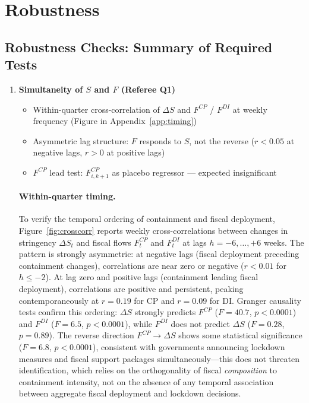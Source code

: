 \documentclass[12pt, a4paper]{article}
\begin{document}
\section{Robustness}
\label{subsec:robustness}


\subsection*{Robustness Checks: Summary of Required Tests}

\begin{enumerate}

\item \textbf{Simultaneity of $S$ and $F$ (Referee Q1)}
\begin{itemize}
    \item Within-quarter cross-correlation of $\Delta S$ and $F^{CP}$ /
        $F^{DI}$ at weekly frequency (Figure in Appendix~\ref{app:timing})
    \item Asymmetric lag structure: $F$ responds to $S$, not the reverse
        ($r < 0.05$ at negative lags, $r > 0$ at positive lags)
    \item $F^{CP}$ lead test: $F_{i,k+1}^{CP}$ as placebo regressor ---
        expected insignificant
\end{itemize}

\paragraph{Within-quarter timing.}
To verify the temporal ordering of containment and fiscal deployment,
Figure~\ref{fig:crosscorr} reports weekly cross-correlations between changes in
stringency $\Delta S_t$ and fiscal flows $F_t^{CP}$ and $F_t^{DI}$ at lags
$h = -6, \ldots, +6$ weeks. The pattern is strongly asymmetric: at negative lags
(fiscal deployment preceding containment changes), correlations are near zero or
negative ($r < 0.01$ for $h \leq -2$). At lag zero and positive lags (containment
leading fiscal deployment), correlations are positive and persistent, peaking
contemporaneously at $r = 0.19$ for CP and $r = 0.09$ for DI. Granger causality
tests confirm this ordering: $\Delta S$ strongly predicts $F^{CP}$ ($F = 40.7$,
$p < 0.0001$) and $F^{DI}$ ($F = 6.5$, $p < 0.0001$), while $F^{DI}$ does not
predict $\Delta S$ ($F = 0.28$, $p = 0.89$). The reverse direction $F^{CP} \to
\Delta S$ shows some statistical significance ($F = 6.8$, $p < 0.0001$),
consistent with governments announcing lockdown measures and fiscal support
packages simultaneously---this does not threaten identification, which relies on
the orthogonality of fiscal \textit{composition} to containment intensity, not on
the absence of any temporal association between aggregate fiscal deployment and
lockdown decisions.



\end{enumerate}
\end{document}
